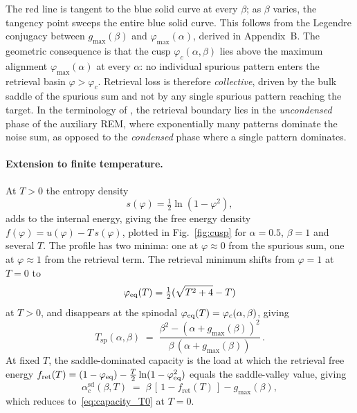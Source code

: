 \documentclass[letterpaper]{article} %
\newcommand{\Bnet}{\beta}
\newcommand{\fret}{f_{\mathrm{ret}}}
\newcommand{\gmax}{g_{\max}}
\newcommand{\acSd}{\alpha_c^{\mathrm{sd}}}
\begin{document}
The red line is tangent to the blue solid curve at every $\Bnet$; as $\Bnet$
varies, the tangency point sweeps the entire blue solid curve. This follows from
the Legendre conjugacy between $g_{\max}(\Bnet)$ and $\varphi_{\max}(\alpha)$,
derived in Appendix~B. The geometric consequence is that the cusp
$\varphi_c(\alpha, \Bnet)$ lies above the maximum alignment $\varphi_{\max}(\alpha)$
at every $\alpha$: no individual spurious pattern enters the retrieval basin
$\varphi > \varphi_c$. Retrieval loss is therefore \textit{collective}, driven by
the bulk saddle of the spurious sum and not by any single spurious pattern
reaching the target. In the terminology of \citet{lucibello2024exponential}, the
retrieval boundary lies in the \textit{uncondensed} phase of the auxiliary REM,
where exponentially many patterns dominate the noise sum, as opposed to the
\textit{condensed} phase where a single pattern dominates.

\paragraph{Extension to finite temperature.}
At $T > 0$ the entropy density~\citep{icml2026theory}
\begin{equation}
    s(\varphi) = \tfrac{1}{2} \ln(1 - \varphi^2),
    \label{eq:entropy}
\end{equation}
adds to the internal energy, giving the free energy density
$f(\varphi) = u(\varphi) - T\,s(\varphi)$, plotted in Fig.~\ref{fig:cusp} for
$\alpha = 0.5$, $\Bnet = 1$ and several $T$. The profile has two minima: one at
$\varphi \approx 0$ from the spurious sum, one at $\varphi \approx 1$ from the
retrieval term. The retrieval minimum shifts from $\varphi = 1$ at $T = 0$ to
\begin{equation}
    \varphi_{\rm eq}(T) = \tfrac{1}{2}(\sqrt{T^2 + 4} - T)
    \label{eq:phi_eq}
\end{equation}
at $T > 0$, and disappears at the spinodal
$\varphi_{\rm eq}(T) = \varphi_c(\alpha, \Bnet)$, giving
\begin{equation}
    T_{\mathrm{sp}}(\alpha, \Bnet) \;=\; \frac{\Bnet^2 - (\alpha + \gmax(\Bnet))^2}
              {\Bnet\,(\alpha + \gmax(\Bnet))}\,.
    \label{eq:spinodal}
\end{equation}
At fixed $T$, the saddle-dominated capacity is the load at which the
retrieval free energy
$\fret(T) = (1 - \varphi_{\rm eq}) - \tfrac{T}{2}\ln(1 - \varphi_{\rm eq}^2)$
equals the saddle-valley value, giving
\begin{equation}
    \acSd(\Bnet, T) \;=\; \Bnet\,[\,1 - \fret(T)\,] - g_{\max}(\Bnet),
    \label{eq:capacity_T}
\end{equation}
which reduces to~\eqref{eq:capacity_T0} at $T = 0$.
\end{document}
